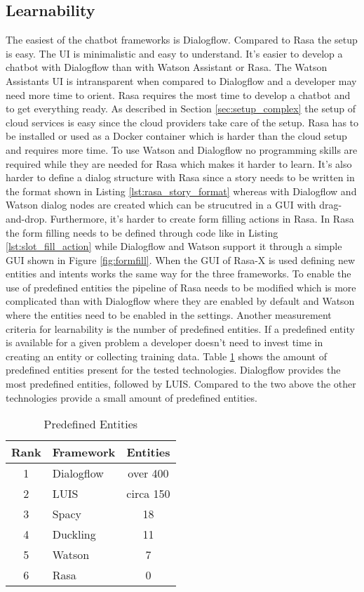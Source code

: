 \subsection*{Learnability}
The easiest of the chatbot frameworks is Dialogflow.
Compared to Rasa the setup is easy.
The UI is minimalistic and easy to understand.
It's easier to develop a chatbot with Dialogflow than with Watson Assistant or Rasa.
The Watson Assistants UI is intransparent when compared to Dialogflow and a developer 
may need more time to orient.
Rasa requires the most time to develop a chatbot and to get everything ready.
As described in Section \ref{sec:setup_complex} the setup of cloud services is 
easy since the cloud providers take care of the setup.
Rasa has to be installed or used as a Docker container which is harder than the cloud 
setup and requires more time.
To use Watson and Dialogflow no programming skills are required while they are needed for 
Rasa which makes it harder to learn.
It's also harder to define a dialog structure with Rasa since a story 
needs to be written in the format shown in Listing \ref{lst:rasa_story_format}
whereas with Dialogflow and Watson dialog nodes are created which 
can be strucutred in a GUI with drag-and-drop.
Furthermore, it's harder to create form filling actions in Rasa.
In Rasa the form filling needs to be defined through code like in Listing \ref{lst:slot_fill_action} while 
Dialogflow and Watson support it through a simple GUI shown in Figure \ref{fig:formfill}.
When the GUI of Rasa-X is used defining new entities and intents works the same way for the three frameworks.
To enable the use of predefined entities the pipeline of Rasa needs to be modified which is more 
complicated than with Dialogflow where they are enabled by default and Watson where the entities need to be 
enabled in the settings.
Another measurement criteria for learnability is the number of predefined entities.
If a predefined entity is available for a given problem a developer doesn't need to 
invest time in creating an entity or collecting training data. 
Table \ref{tab:predefined_entities} shows the amount of predefined entities 
present for the tested technologies.
Dialogflow provides the most predefined entities, followed by LUIS.
Compared to the two above the other technologies provide a small amount of predefined entities.
\begin{table}[H]
    \centering
    \begin{tabular}{ c | l | c }
        Rank & Framework &  Entities \\ \hline \hline
        1 & \multirow{1}{*}{Dialogflow} & over 400 \\
        2 & \multirow{1}{*}{LUIS} & circa 150 \\
        3 & \multirow{1}{*}{Spacy} & 18 \\
        4 & \multirow{1}{*}{Duckling} & 11 \\
        5 & \multirow{1}{*}{Watson} & 7  \\
        6 & \multirow{1}{*}{Rasa} & 0 \\
    \end{tabular}
    \caption{Predefined Entities} \label{tab:predefined_entities}
\end{table} \noindent
